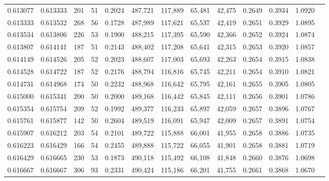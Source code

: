 \begin{tabular}{rrrrrrrrrrrrr}
0.613077 & 0.613333 &    201 &    51 &                                     0.2024 & 487,721 & 117,889 &  65,481 &  42,475 & 0.2649 & 0.3934 & 1.0920 \\
0.613333 & 0.613532 &    268 &    56 &                                     0.1728 & 487,989 & 117,621 &  65,537 &  42,419 & 0.2651 & 0.3929 & 1.0895 \\
0.613534 & 0.613806 &    226 &    53 &                                     0.1900 & 488,215 & 117,395 &  65,590 &  42,366 & 0.2652 & 0.3924 & 1.0874 \\
0.613807 & 0.614141 &    187 &    51 &                                     0.2143 & 488,402 & 117,208 &  65,641 &  42,315 & 0.2653 & 0.3920 & 1.0857 \\
0.614149 & 0.614526 &    205 &    52 &                                     0.2023 & 488,607 & 117,003 &  65,693 &  42,263 & 0.2654 & 0.3915 & 1.0838 \\
0.614528 & 0.614722 &    187 &    52 &                                     0.2176 & 488,794 & 116,816 &  65,745 &  42,211 & 0.2654 & 0.3910 & 1.0821 \\
0.614731 & 0.614968 &    174 &    50 &                                     0.2232 & 488,968 & 116,642 &  65,795 &  42,161 & 0.2655 & 0.3905 & 1.0805 \\
0.615000 & 0.615341 &    200 &    50 &                                     0.2000 & 489,168 & 116,442 &  65,845 &  42,111 & 0.2656 & 0.3901 & 1.0786 \\
0.615354 & 0.615754 &    209 &    52 &                                     0.1992 & 489,377 & 116,233 &  65,897 &  42,059 & 0.2657 & 0.3896 & 1.0767 \\
0.615761 & 0.615877 &    142 &    50 &                                     0.2604 & 489,519 & 116,091 &  65,947 &  42,009 & 0.2657 & 0.3891 & 1.0754 \\
0.615907 & 0.616212 &    203 &    54 &                                     0.2101 & 489,722 & 115,888 &  66,001 &  41,955 & 0.2658 & 0.3886 & 1.0735 \\
0.616223 & 0.616429 &    166 &    54 &                                     0.2455 & 489,888 & 115,722 &  66,055 &  41,901 & 0.2658 & 0.3881 & 1.0719 \\
0.616429 & 0.616665 &    230 &    53 &                                     0.1873 & 490,118 & 115,492 &  66,108 &  41,848 & 0.2660 & 0.3876 & 1.0698 \\
0.616667 & 0.616667 &    306 &    93 &                                     0.2331 & 490,424 & 115,186 &  66,201 &  41,755 & 0.2661 & 0.3868 & 1.0670 \\

\end{tabular}
